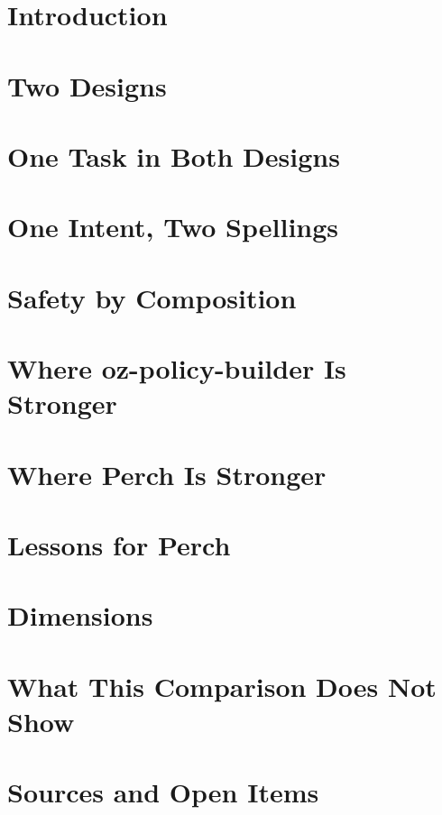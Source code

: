 \section{Introduction}\label{sec:overview}

\section{Two Designs}\label{sec:designs}

\section{One Task in Both Designs}\label{sec:same-task}

\section{One Intent, Two Spellings}\label{sec:spellings}

\section{Safety by Composition}\label{sec:composition}

\section{Where oz-policy-builder Is Stronger}\label{sec:opb-stronger}

\section{Where Perch Is Stronger}\label{sec:perch-stronger}

\section{Lessons for Perch}\label{sec:lessons}

\section{Dimensions}\label{sec:dimensions}

\section{What This Comparison Does Not Show}\label{sec:limits}

\appendix
\section{Sources and Open Items}\label{sec:sources}

